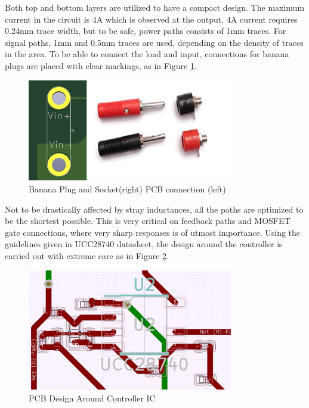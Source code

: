 Both top and bottom layers are utilized to have a compact design. The maximum current in the circuit is 4A which is observed at the output. 4A current requires 0.24mm trace width, but to be safe, power paths consists of 1mm traces. For signal paths, 1mm and 0.5mm traces are used, depending on the density of traces in the area. To be able to connect the load and input, connections for banana plugs are placed with clear markings, as in Figure \ref{fig:bananaplug}.

\begin{figure}[H]
\begin{center}
\includegraphics[width=0.8\textwidth]{figures/bananaplug.jpg}
\caption{Banana Plug and Socket(right) PCB connection (left) }
\label{fig:bananaplug}
\end{center}
\end{figure}

Not to be drastically affected by stray inductances, all the paths are optimized to be the shortest possible. This is very critical on feedback paths and MOSFET gate connections, where very sharp responses is of utmost importance. Using the guidelines given in UCC28740 datasheet, the design around the controller is carried out with extreme care as in Figure  \ref{fig:controllerdesign}.

\begin{figure}[H]
\begin{center}
\includegraphics[width=0.8\textwidth]{figures/controllerdesign.jpg}
\caption{PCB Design Around Controller IC}
\label{fig:controllerdesign}
\end{center}
\end{figure}


